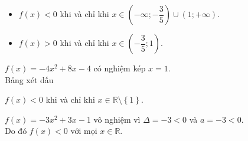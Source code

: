 \begin{bt}
{\begin{enumEX}[a)]{1}
\begin{center}
\begin{tikzpicture}
				\end{tikzpicture}
			\end{center}
			\begin{itemize}
				\item $f(x)<0$ khi và chỉ khi $x\in\left(-\infty;-\dfrac{3}{5}\right)\cup(1;+\infty)$.
				\item $f(x)>0$ khi và chỉ khi $x\in\left(-\dfrac{3}{5};1\right)$.
			\end{itemize}
			\item $f(x)=-4x^2+8x-4$ có nghiệm kép $x=1$.\\
			Bảng xét dấu
			\begin{center}
			\end{center}
			$f(x)<0$ khi và chỉ khi $x\in\mathbb{R}\setminus\left\{1\right\}$.
			\item $f(x)=-3x^2+3x-1$ vô nghiệm vì $\Delta=-3<0$ và $a=-3<0$.\\
			Do đó $f(x)<0$ với mọi $x\in\mathbb{R}$.
		\end{enumEX}
	}
\end{bt}

